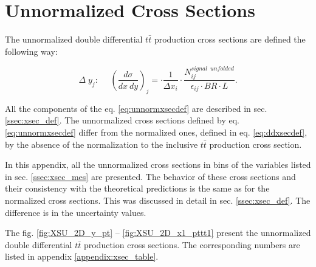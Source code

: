 \chapter{Unnormalized Cross Sections}\label{appendix:unnorm_XSec}

The unnormalized double differential $t\bar{t}$ production cross sections are defined the following way:

\begin{equation}\label{eq:unnormxsecdef}
 \Delta\;y_{j}: \:\:\:\:\:\:(\frac{d\sigma}{dx\:dy})_{j} = \cdot \frac{1}{\Delta x_{i}} \cdot \frac{N^{signal\:\;unfolded}_{ij}}{\epsilon_{ij} \cdot BR \cdot L}.
\end{equation}

All the components of the eq. \ref{eq:unnormxsecdef} are described in sec. \ref{ssec:xsec_def}. The unnormalized cross sections
defined by eq. \ref{eq:unnormxsecdef} differ from the normalized ones, defined in eq. \ref{eq:ddxsecdef}, by the absence of
the normalization to the inclusive $t\bar{t}$ production cross section.

In this appendix, all the unnormalized cross sections in bins of the variables listed in sec. \ref{ssec:xsec_mes} are presented.
The behavior of these cross sections and their consistency with the theoretical predictions is the same as for the normalized cross sections.
This was discussed in detail in sec. \ref{ssec:xsec_def}. The difference is in the uncertainty values.

The fig. \ref{fig:XSU_2D_y_pt} -- \ref{fig:XSU_2D_x1_pttt1} present the unnormalized double differential $t\bar{t}$ production cross sections.
The corresponding numbers are listed in appendix \ref{appendix:xsec_table}.

